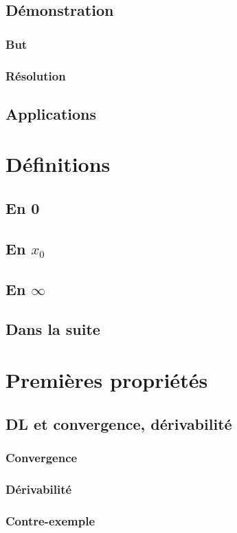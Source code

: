 \documentclass[12pt,a4paper,french]{book}
\begin{document}
		\subsection{Démonstration}
			\subsubsection{But}
			\subsubsection{Résolution}
		\subsection{Applications}
	\section{Définitions}
		\subsection{En 0}
		\subsection{En $x_0$}
		\subsection{En $\infty$}
		\subsection{Dans la suite}
	\section{Premières propriétés}
		\subsection{DL et convergence, dérivabilité}
			\subsubsection{Convergence}
			\subsubsection{Dérivabilité}
			\subsubsection{Contre-exemple}
\end{document}
